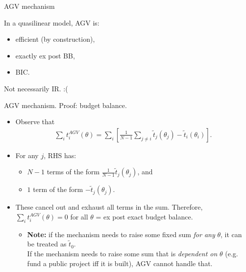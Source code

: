 \documentclass[english,10pt
,aspectratio=169
,handout
]{beamer}
\begin{document}
\begin{frame}{AGV mechanism}
\begin{theorem}[AGV]
	In a \alert{quasilinear} model, AGV is:
	\begin{itemize}
		\item efficient (by construction),
		\item exactly ex post BB,
		\item BIC.
	\end{itemize}
\end{theorem}
Not necessarily IR. :(
\end{frame}


\begin{frame}{AGV mechanism. Proof: budget balance.}
\begin{itemize}
	\item Observe that
	\vspace{-0.5em}\begin{align*}
		\sum_i t_i^{AGV} (\theta) = \sum_i \left[ \frac{1}{N-1} \sum_{j \neq i} \tilde{t}_j (\theta_j) - \tilde{t}_i (\theta_i) \right].
	\end{align*}
	\item For any $j$, RHS has:
	\begin{itemize}
		\item $N-1$ terms of the form $\frac{1}{N-1} \tilde{t}_j (\theta_j)$, and
		\item $1$ term of the form $-\tilde{t}_j(\theta_j)$.
	\end{itemize}
	\item These cancel out and exhaust all terms in the sum. Therefore, $\sum_i t_i^{AGV} (\theta) = 0$ for all $\theta$ = ex post exact budget balance.
	\begin{itemize}
		\item \textbf{Note:} if the mechanism needs to raise some fixed sum \emph{for any} $\theta$, it can be treated as $\tilde{t}_0$. \\
		If the mechanism needs to raise some sum that is \emph{dependent on} $\theta$ (e.g. fund a public project iff it is built), AGV \alert{cannot} handle that.
	\end{itemize}
\end{itemize}
\end{frame}
\end{document}
